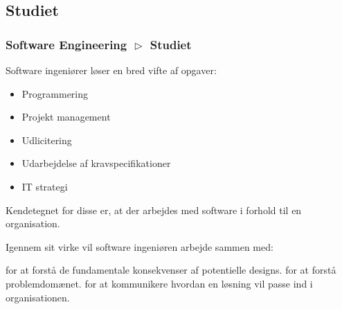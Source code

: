 \subsection{Studiet}
\begin{frame}[fragile]
  \frametitle{Software Engineering $\vartriangleright$ Studiet}
  \vspace{1mm}
  Software ingeniører løser en bred vifte af opgaver:
  \begin{itemize}
    \item Programmering
    \item Projekt management
    \item Udlicitering
    \item Udarbejdelse af kravspecifikationer
    \item IT strategi
  \end{itemize}
  
  \pause
  \vspace{3mm}
  Kendetegnet for disse er, at der arbejdes med software i forhold til en organisation.
  
  \pause
  \vspace{3mm}
  Igennem sit virke vil software ingeniøren arbejde sammen med:
  \begin{itemize}
     for at forstå de fundamentale konsekvenser af potentielle designs.
     for at forstå problemdomænet.
     for at kommunikere hvordan en løsning vil passe ind i organisationen.
  \end{itemize}
\end{frame}

\newcommand{\entry}[7]{
  \node[
    rectangle,
    draw=purple,
    anchor=south west,
    align=center,
    minimum height=\cellheight,
    minimum width=(#4-#3)*\cellwidth+((#4-#3)-1)*\cellspacing,
    #7
  ]
  (#1) at (
    [
      xshift=\xoffset+#3*\cellwidth+(#3-1)*\cellspacing,
      yshift=\yoffset+(#2-1)*\cellheight+(#2-2)*\cellspacing,
    ] semorigo)
  {
    #5\\\textcolor{orange}{#6 ECTS}
  }
}

\newcommand{\entryNormal}[6]{\entry{#1}{#2}{#3}{#4}{#5}{#6}{}}
\newcommand{\entryProject}[6]{\entry{#1}{#2}{#3}{#4}{#5}{#6}{fill=purple!10,}}
\newcommand{\entryElective}[6]{\entry{#1}{#2}{#3}{#4}{#5}{#6}{pattern=north east lines, pattern color=purple!10, even odd rule,}}
\newcommand{\entryNormalMsc}[6]{\entry{#1}{#2}{#3}{#4}{#5}{#6}{draw=blue}}
\newcommand{\entryProjectMsc}[6]{\entry{#1}{#2}{#3}{#4}{#5}{#6}{draw=blue,fill=blue!10,}}
\newcommand{\entryElectiveMsc}[6]{\entry{#1}{#2}{#3}{#4}{#5}{#6}{draw=blue,pattern=north east lines, pattern color=blue!10, even odd rule,}}

